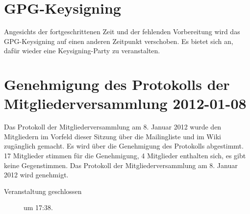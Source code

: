 \documentclass[a4paper,12pt]{scrartcl}
\begin{document}
\section{GPG-Keysigning}
\postponed
Angesichts der fortgeschrittenen Zeit und der fehlenden Vorbereitung wird das
GPG-Keysigning auf einen anderen Zeitpunkt verschoben. Es bietet sich an, dafür
wieder eine Keysigning-Party zu veranstalten.

\section{Genehmigung des Protokolls der Mitgliederversammlung 2012-01-08}
Das Protokoll der Mitgliederversammlung am 8. Januar 2012 wurde den Mitgliedern
im Vorfeld dieser Sitzung über die Mailingliste und im Wiki zugänglich gemacht.
Es wird über die Genehmigung des Protokolls abgestimmt. 17 Mitglieder stimmen
für die Genehmigung, 4 Mitglieder enthalten sich, es gibt keine Gegenstimmen.
Das Protokoll der Mitgliederversammlung am 8. Januar 2012 wird genehmigt.

\begin{description}
  \item[Veranstaltung geschlossen] um 17:38.
\end{description}

\appendix

\end{document}
